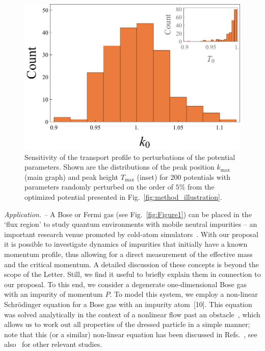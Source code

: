 \documentclass[twocolumn,amsmath,amssymb,showpacs,prl,superscriptaddress,aps]{revtex4-1}
\begin{document}
\begin{figure}
   \includegraphics[width=1\linewidth]{figures/plot_sensitivity.pdf}
 \caption[Sensitivity Plot]{Sensitivity of the transport profile to perturbations of the potential parameters. Shown are the distributions of the peak position $k_{\mathrm{max}}$ (main graph) and peak height $T_{\mathrm{max}}$ (inset) for 200 potentials with parameters randomly perturbed on the order of $5\%$ from the optimized potential presented in Fig.~\ref{fig:method_illustration}.}
 \label{fig:sensitivity}
\end{figure}



{\it Application. --} A Bose or Fermi gas (see Fig.~\ref{fig:Figure1}) can be placed in the `flux region'
to study quantum environments with mobile neutral impurities -- an important research venue promoted by cold-atom 
simulators~\cite{zwierlein2009,salomon2009,grimm2012, widera2012, catani2012, fukuhara2013, hu2016,arlt2016,zaccanti2017}.
With our proposal it is possible to investigate dynamics of impurities that initially have 
a known momentum profile, thus allowing for a direct measurement of the effective mass and 
the critical momentum. A detailed discussion of these concepts is beyond the scope 
of the Letter. Still, we find it useful to briefly explain them in connection to our proposal. 
To this end, we consider a degenerate one-dimensional Bose gas with an impurity of momentum $P$.
To model this system, we employ a non-linear Schr{\"o}dinger equation
for a Bose gas with an impurity atom~[10]. This equation was solved analytically
in the context of a nonlinear flow past an obstacle~\cite{hakim1997}, 
which allows us to work out all properties of the dressed particle in a simple manner; 
note that this (or a similar) non-linear equation has been discussed in Refs.~\cite{kamenev2016, volosniev2017, mistakidis2018, dehkharghani2018, pastukhov2018},
see also~\cite{sacha2006, catani2012, kain2016, parisi2017,grusdt2017, pastukhov2017, kain2018} for other relevant studies. 
\end{document}
